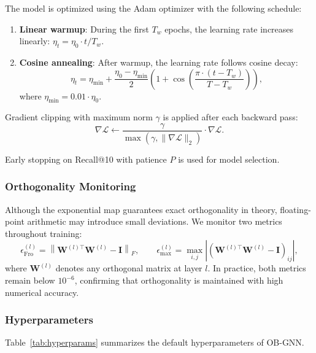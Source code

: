 The model is optimized using the Adam optimizer with the following schedule:
\begin{enumerate}
    \item \textbf{Linear warmup}: During the first $T_w$ epochs, the learning rate increases linearly:
    $\eta_t = \eta_0 \cdot t / T_w$.

    \item \textbf{Cosine annealing}: After warmup, the learning rate follows cosine decay:
    \begin{equation}
        \eta_t = \eta_{\min} + \frac{\eta_0 - \eta_{\min}}{2} \left(1 + \cos\!\left(\frac{\pi \cdot (t - T_w)}{T - T_w}\right)\right),
    \end{equation}
    where $\eta_{\min} = 0.01 \cdot \eta_0$.
\end{enumerate}

Gradient clipping with maximum norm $\gamma$ is applied after each backward pass:
\begin{equation}
    \nabla\mathcal{L} \leftarrow \frac{\gamma}{\max(\gamma, \|\nabla\mathcal{L}\|_2)} \cdot \nabla\mathcal{L}.
\end{equation}

Early stopping on Recall@10 with patience $P$ is used for model selection.


\subsubsection{Orthogonality Monitoring}

Although the exponential map guarantees exact orthogonality in theory, floating-point arithmetic may introduce small deviations. We monitor two metrics throughout training:
\begin{equation}
    \epsilon_{\text{Fro}}^{(l)} = \left\|\mathbf{W}^{(l)\top} \mathbf{W}^{(l)} - \mathbf{I}\right\|_F, \qquad
    \epsilon_{\max}^{(l)} = \max_{i,j} \left|\left(\mathbf{W}^{(l)\top} \mathbf{W}^{(l)} - \mathbf{I}\right)_{ij}\right|,
\end{equation}
where $\mathbf{W}^{(l)}$ denotes any orthogonal matrix at layer $l$. In practice, both metrics remain below $10^{-6}$, confirming that orthogonality is maintained with high numerical accuracy.


\subsubsection{Hyperparameters}

Table~\ref{tab:hyperparams} summarizes the default hyperparameters of OB-GNN.

